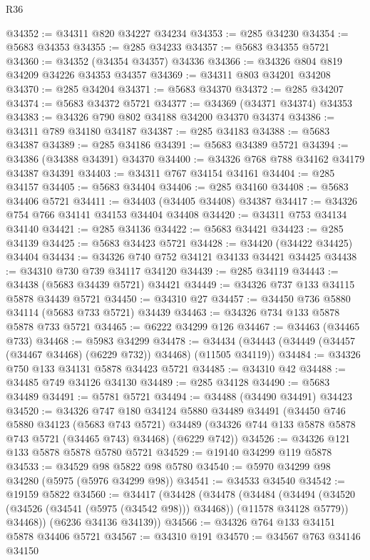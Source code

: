 \begin{lexlean}{R36}
\begin{coremodule}
@34352 := @34311 @820 @34227 @34234
@34353 := @285 @34230
@34354 := @5683 @34353
@34355 := @285 @34233
@34357 := @5683 @34355 @5721
@34360 := @34352 (@34354 @34357) @34336
@34366 := @34326 @804 @819 @34209 @34226 @34353 @34357
@34369 := @34311 @803 @34201 @34208
@34370 := @285 @34204
@34371 := @5683 @34370
@34372 := @285 @34207
@34374 := @5683 @34372 @5721
@34377 := @34369 (@34371 @34374) @34353
@34383 := @34326 @790 @802 @34188 @34200 @34370 @34374
@34386 := @34311 @789 @34180 @34187
@34387 := @285 @34183
@34388 := @5683 @34387
@34389 := @285 @34186
@34391 := @5683 @34389 @5721
@34394 := @34386 (@34388 @34391) @34370
@34400 := @34326 @768 @788 @34162 @34179 @34387 @34391
@34403 := @34311 @767 @34154 @34161
@34404 := @285 @34157
@34405 := @5683 @34404
@34406 := @285 @34160
@34408 := @5683 @34406 @5721
@34411 := @34403 (@34405 @34408) @34387
@34417 := @34326 @754 @766 @34141 @34153 @34404 @34408
@34420 := @34311 @753 @34134 @34140
@34421 := @285 @34136
@34422 := @5683 @34421
@34423 := @285 @34139
@34425 := @5683 @34423 @5721
@34428 := @34420 (@34422 @34425) @34404
@34434 := @34326 @740 @752 @34121 @34133 @34421 @34425
@34438 := @34310 @730 @739 @34117 @34120
@34439 := @285 @34119
@34443 := @34438 (@5683 @34439 @5721) @34421
@34449 := @34326 @737 @133 @34115 @5878 @34439 @5721
@34450 := @34310 @27
@34457 := @34450 @736 @5880 @34114 (@5683 @733 @5721) @34439
@34463 := @34326 @734 @133 @5878 @5878 @733 @5721
@34465 := @6222 @34299 @126
@34467 := @34463 (@34465 @733)
@34468 := @5983 @34299
@34478 := @34434 (@34443 (@34449 (@34457 (@34467 @34468) (@6229 @732)) @34468) (@11505 @34119))
@34484 := @34326 @750 @133 @34131 @5878 @34423 @5721
@34485 := @34310 @42
@34488 := @34485 @749 @34126 @34130
@34489 := @285 @34128
@34490 := @5683 @34489
@34491 := @5781 @5721
@34494 := @34488 (@34490 @34491) @34423
@34520 := @34326
    @747
    @180
    @34124
    @5880
    @34489
    @34491
    (@34450
      @746
      @5880
      @34123
      (@5683 @743 @5721)
      @34489
      (@34326 @744 @133 @5878 @5878 @743 @5721 (@34465 @743) @34468)
      (@6229 @742))
@34526 := @34326 @121 @133 @5878 @5878 @5780 @5721
@34529 := @19140 @34299 @119 @5878
@34533 := @34529 @98 @5822 @98 @5780
@34540 := @5970 @34299 @98 @34280 (@5975 (@5976 @34299 @98))
@34541 := @34533 @34540
@34542 := @19159 @5822
@34560 := @34417
    (@34428
      (@34478
        (@34484
          (@34494 (@34520 (@34526 (@34541 (@5975 (@34542 @98))) @34468)) (@11578 @34128 @5779))
          @34468))
      (@6236 @34136 @34139))
@34566 := @34326 @764 @133 @34151 @5878 @34406 @5721
@34567 := @34310 @191
@34570 := @34567 @763 @34146 @34150

\end{coremodule}
\end{lexlean}
